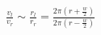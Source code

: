 \documentclass[preview]{standalone}
\begin{document}
\begin{center}
$\frac{v_{l} } {v_{r} }\sim \frac{r_{l}}{ {r_{r} } } =$$\frac{2\pi(r+\frac{w}{2})}{2\pi(r-\frac{w}{2})}$
\end{center}
\end{document}

